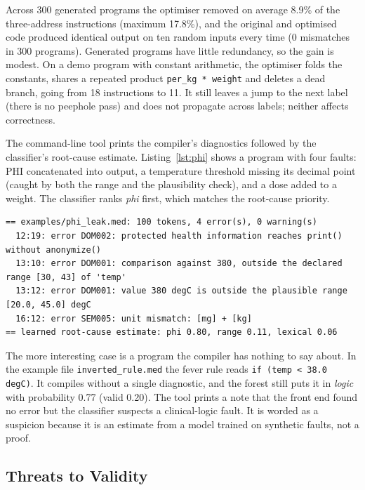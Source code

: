 \documentclass[12pt,a4paper]{article}
\newcommand{\code}[1]{\texttt{#1}}
\newcommand{\OptMean}{8.9}
\newcommand{\OptMax}{17.8}
\newcommand{\OptPrograms}{300}
\newcommand{\OptMismatch}{0}
\begin{document}
Across 300 generated programs the optimiser removed on average \OptMean\% of the three-address instructions (maximum
\OptMax\%), and the original and optimised code produced identical output on ten random inputs every time
(\OptMismatch{} mismatches in \OptPrograms{} programs). Generated programs have little redundancy, so the gain is modest.
On a demo program with constant arithmetic, the optimiser folds the constants, shares a repeated product
\code{per\_kg * weight} and deletes a dead branch, going from 18 instructions to 11. It still leaves a jump to the next
label (there is no peephole pass) and does not propagate across labels; neither affects correctness.

The command-line tool prints the compiler's diagnostics followed by the classifier's root-cause estimate.
Listing~\ref{lst:phi} shows a program with four faults: PHI concatenated into output, a temperature threshold missing
its decimal point (caught by both the range and the plausibility check), and a dose added to a weight. The classifier
ranks \emph{phi} first, which matches the root-cause priority.

\begin{lstlisting}[language={},numbers=none,basicstyle=\ttfamily\scriptsize,caption={Output of \texttt{medcheck.py examples/phi\_leak.med}.},label={lst:phi}]
== examples/phi_leak.med: 100 tokens, 4 error(s), 0 warning(s)
  12:19: error DOM002: protected health information reaches print() without anonymize()
  13:10: error DOM001: comparison against 380, outside the declared range [30, 43] of 'temp'
  13:12: error DOM001: value 380 degC is outside the plausible range [20.0, 45.0] degC
  16:12: error SEM005: unit mismatch: [mg] + [kg]
== learned root-cause estimate: phi 0.80, range 0.11, lexical 0.06
\end{lstlisting}

The more interesting case is a program the compiler has nothing to say about. In the example file
\texttt{inverted\_rule.med} the fever rule reads \code{if (temp < 38.0 degC)}. It compiles without a single
diagnostic, and the forest still puts it in \emph{logic} with probability 0.77 (valid 0.20). The tool prints a note
that the front end found no error but the classifier suspects a clinical-logic fault. It is worded as a suspicion
because it is an estimate from a model trained on synthetic faults, not a proof.

\subsection{Threats to Validity}
\label{sec:limits}
\end{document}
